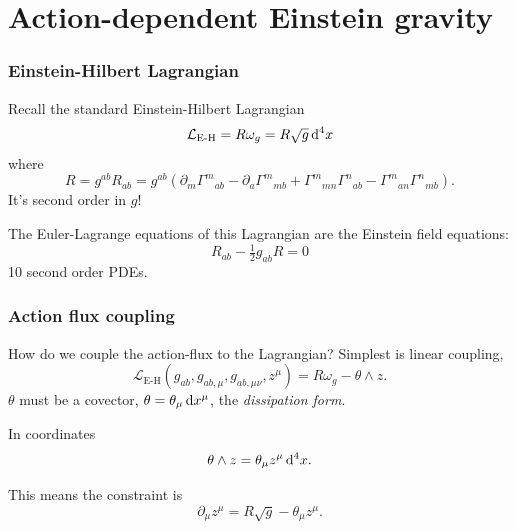 \documentclass[xcolor=dvipsnames]{beamer}
\begin{document}
\section{Action-dependent Einstein gravity}
\begin{frame}
	\frametitle{Einstein-Hilbert Lagrangian}
	Recall the standard Einstein-Hilbert Lagrangian
	\begin{equation*}
		\mathcal{L}_{\text{E-H}} = R\omega_g = R \sqrt{g} \,\mathrm{d}^4 x
	\end{equation*}
	where
	\begin{equation*}
		R = g^{ab}R_{ab} = g^{ab}(\partial_m{\Gamma^m}_{ab} - \partial_a {\Gamma^m}_{mb} +
		{\Gamma^m}_{mn} {\Gamma^n}_{ab} - {\Gamma^m}_{an}{\Gamma^n}_{mb}).
	\end{equation*}
	\pause It's second order in \( g \)!

	\pause The Euler-Lagrange equations of this Lagrangian are the Einstein field equations:
	\begin{equation*}
		R_{ab} - \tfrac{1}{2}g_{ab}R = 0
	\end{equation*}
	10 second order PDEs. 
\end{frame}

\begin{frame}
	\frametitle{Action flux coupling}
	How do we couple the action-flux to the Lagrangian? \pause Simplest is linear coupling,
	\begin{equation*}
		\mathcal{L}_\text{E-H}(g_{ab}, g_{ab,\mu}, g_{ab,\mu\nu}, z^\mu) = R\omega_g - \theta
		\wedge z.
	\end{equation*}
	\pause \( \theta \) must be a covector, \( \theta = \theta_\mu \,\mathrm{d} x^\mu \), the
	\emph{dissipation form}. 
	
	\pause In coordinates
	\begin{equation*} 
		\theta \wedge z = \theta_\mu z^\mu \,\mathrm{d}^4 x.
	\end{equation*}

	\pause This means the constraint is
	\begin{equation*}
		\partial_\mu z^\mu = R\sqrt{g} - \theta_\mu z^\mu.
	\end{equation*}
\end{frame}
\end{document}
